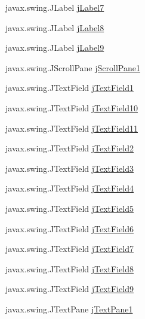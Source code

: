 \begin{DoxyCompactItemize}
\item 
javax.\+swing.\+J\+Label \mbox{\hyperlink{classsoftware_1_1parasoftware3_a244f99c3af34ae7b3a9046d6efc18a95}{j\+Label7}}
\item 
javax.\+swing.\+J\+Label \mbox{\hyperlink{classsoftware_1_1parasoftware3_aa6b9c08a2dd3c58649ccab6707950e45}{j\+Label8}}
\item 
javax.\+swing.\+J\+Label \mbox{\hyperlink{classsoftware_1_1parasoftware3_ac84a161604551842c24b960457e78a4e}{j\+Label9}}
\item 
javax.\+swing.\+J\+Scroll\+Pane \mbox{\hyperlink{classsoftware_1_1parasoftware3_aaeb200a8e3cbd49b6ee645ee670e5af7}{j\+Scroll\+Pane1}}
\item 
javax.\+swing.\+J\+Text\+Field \mbox{\hyperlink{classsoftware_1_1parasoftware3_a3415ad58f32ae42cfc88f7b498a2db38}{j\+Text\+Field1}}
\item 
javax.\+swing.\+J\+Text\+Field \mbox{\hyperlink{classsoftware_1_1parasoftware3_a8a6dfd58aa72b1900f0fd0dcf7302181}{j\+Text\+Field10}}
\item 
javax.\+swing.\+J\+Text\+Field \mbox{\hyperlink{classsoftware_1_1parasoftware3_a1936999315b749f7eb88a81dae02582b}{j\+Text\+Field11}}
\item 
javax.\+swing.\+J\+Text\+Field \mbox{\hyperlink{classsoftware_1_1parasoftware3_a420e41087126364b3392b21a69724347}{j\+Text\+Field2}}
\item 
javax.\+swing.\+J\+Text\+Field \mbox{\hyperlink{classsoftware_1_1parasoftware3_a19c3b86c1d29a59d3e2dca7ca6e34e35}{j\+Text\+Field3}}
\item 
javax.\+swing.\+J\+Text\+Field \mbox{\hyperlink{classsoftware_1_1parasoftware3_a49b508e80d5a8bb6886b95f79fc5446e}{j\+Text\+Field4}}
\item 
javax.\+swing.\+J\+Text\+Field \mbox{\hyperlink{classsoftware_1_1parasoftware3_acd863025f5ab774c7139623c6dab2f9b}{j\+Text\+Field5}}
\item 
javax.\+swing.\+J\+Text\+Field \mbox{\hyperlink{classsoftware_1_1parasoftware3_a38ca1c67c4ebd2265e207c9c76ce72ad}{j\+Text\+Field6}}
\item 
javax.\+swing.\+J\+Text\+Field \mbox{\hyperlink{classsoftware_1_1parasoftware3_a32fd4ba8157830b2185c828121e52320}{j\+Text\+Field7}}
\item 
javax.\+swing.\+J\+Text\+Field \mbox{\hyperlink{classsoftware_1_1parasoftware3_a1be214ec91e03d8a319ac31581cd559f}{j\+Text\+Field8}}
\item 
javax.\+swing.\+J\+Text\+Field \mbox{\hyperlink{classsoftware_1_1parasoftware3_a9fe814b0f2e84f9047438996abdea4a3}{j\+Text\+Field9}}
\item 
javax.\+swing.\+J\+Text\+Pane \mbox{\hyperlink{classsoftware_1_1parasoftware3_a1c8fb0e0c3e99513f7c1245df8f4944a}{j\+Text\+Pane1}}
\end{DoxyCompactItemize}


